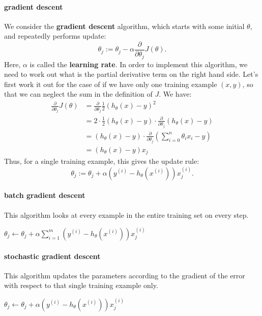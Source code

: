\documentclass{article}
\begin{document}
\paragraph{gradient descent} We consider the {\bf gradient descent} algorithm, which starts with some initial $\theta$, and repeatedly performs update:
\begin{equation}
	\theta_j := \theta_j - \alpha\frac{\partial}{\partial \theta_j}J(\theta).
\end{equation}
Here, $\alpha$ is called the {\bf learning rate}. 
In order to implement this algorithm, we need to work out what is the partial derivative term on the right hand side. Let's first work it out for the case of if we have only one training example $(x,y)$, so that we can neglect the sum in the definition of $J$. We have:
\begin{align*}
	\frac{\partial}{\partial\theta_j}J(\theta) &= \frac{\partial}{\partial\theta_j}\frac{1}{2}(h_\theta(x)-y)^2 \\
	&= 2\cdot\frac{1}{2}(h_\theta(x)-y)\cdot\frac{\partial}{\partial\theta_j}(h_\theta(x)-y)\\
	&= (h_\theta(x)-y)\cdot\frac{\partial}{\partial\theta_j}\left(\sum_{i=0}^{n}\theta_ix_i-y\right) \\
	&= (h_\theta(x)-y)x_j
\end{align*}
Thus, for a single training example, this gives the update rule:
\begin{equation}
	\label{eq:update_rule}
	\theta_j := \theta_j + \alpha\left(y^{(i)}-h_\theta(x^{(i)})\right)x_j^{(i)}.
\end{equation}
\paragraph{batch gradient descent} This algorithm looks at every example in the entire training set on every step. 
\begin{algorithmic}
\Repeat 
	\State $\theta_j \gets \theta_j + \alpha \sum_{i=1}^{m}\left(y^{(i)} - h_\theta(x^{(i)})\right)x_j^{(i)}$
\end{algorithmic}
\paragraph{stochastic gradient descent} This algorithm updates the parameters according to the gradient of the error with respect to that single training example only. 
\begin{algorithmic}
\Loop
		\State $\theta_j \gets \theta_j + \alpha \left(y^{(i)} - h_\theta(x^{(i)})\right)x_j^{(i)}$
	\EndFor
\EndLoop
\end{algorithmic}
\end{document}
